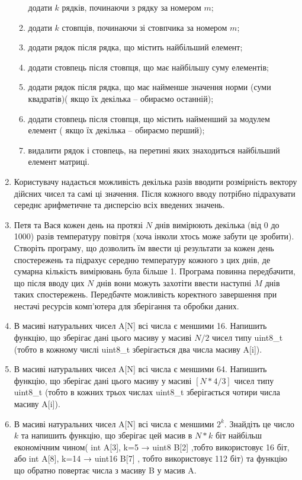\documentclass[]{article}
\makeatletter
\newcommand{\xslalph}[1]{\expandafter\@xslalph\csname c@#1\endcsname}
\newcommand{\@xslalph}[1]{%
    \ifcase#1\or а\or б\or в\or г\or д\or e\or є\or ж\or з\or i%
    \or й\or к\or л\or м\or н\or о\or п\or р\or с\or т%
    \or у\or ф\or х\or ц\or ч\or ш\or ю\or я\or аа\or бб\or вв %
    \else\@ctrerr\fi%
}
\makeatother
\begin{document}
\begin{enumerate}
\begin{enumerate}[label=\xslalph*)]
  додати $k$ рядків, починаючи з рядку за номером $m$;
\item
  додати $k$ стовпців, починаючи зі стовпчика за номером $m$;
\item
  додати рядок після рядка, що містить найбільший елемент;
\item
  додати стовпець після стовпця, що має найбільшу суму елементів;
\item
  додати рядок після рядка, що має найменше значення норми (суми квадратів)(
якщо їх декілька -- обираємо останній);
\item
  додати стовпець після стовпця, що містить найменший за модулем елемент (
якщо їх декілька -- обираємо перший);
\item
  видалити рядок і стовпець, на перетині яких знаходиться найбільший
  елемент матриці.
\end{enumerate}

\item
  Користувачу надається можливість декілька разів вводити розмірність
  вектору дійсних чисел та самі ці значення. Після кожного вводу
  потрібно підрахувати середнє арифметичне та дисперсію всіх введених
  значень.
\item
  Петя та Вася кожен день на протязі $N$ днів вимірюють
  декілька (від 0 до 1000) разів температуру повітря (хоча інколи хтось
  може забути це зробити). Створіть програму, що дозволить їм ввести ці
  результати за кожен день спостережень та підрахує середню температуру
  кожного з цих днів, де сумарна кількість вимірювань була більше 1.
  Програма повинна передбачити, що після вводу цих $N$ днів вони можуть
  захотіти ввести наступні $M$ днів таких спостережень. Передбачте
  можливість коректного завершення при нестачі ресурсів комп'ютера для
  зберігання та обробки даних.
\item
 В масиві натуральних чисел A{[}N{]} всі числа є меншими 16. Напишить
  функцію, що зберігає дані цього масиву у масиві $N/2$ чисел типу
  uint8\_t (тобто в кожному числі uint8\_t зберігається два числа масиву
  A{[}i{]}).
\item
  В масиві натуральних чисел A{[}N{]} всі числа є меншими 64. Напишить
  функцію, що зберігає дані цього масиву у масиві $[N*4/3]$ чисел типу
  uint8\_t (тобто в кожних трьох числах uint8\_t зберігається чотири
  числа масиву A{[}i{]}).
\item
  В масиві натуральних чисел A{[}N{]} всі числа є меншими \(2^{k}\).
  Знайдіть це число $k$ та напишить функцію, що зберігає цей масив в $N*k$
  біт найбільш економічним чином( int A{[}3{]}, k=5 → uint8 B{[}2{]}
  ,тобто використовує 16 біт, або int A{[}8{]}, k=14 → uint16 B{[}7{]} ,
  тобто використовує 112 біт) та функцію що обратно повертає числа з
  масиву B у масив A.
\end{enumerate}
\end{document}
